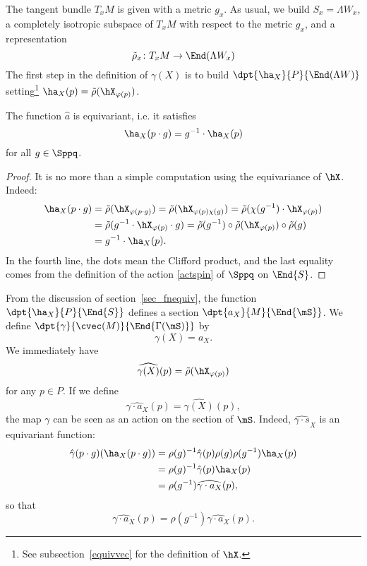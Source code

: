 The tangent bundle $T_xM$ is given with a metric $g_x$. As usual, we build $S_x=\Lambda W _x$, a completely isotropic subspace of $T_xM$ with respect to the metric $g_x$, and a representation
\[
	\tilde \rho_x\colon T_xM\to \End(\Lambda W_x)
\]
The first step in the definition of $\gamma(X)$ is to build $\dpt{\ha_X}{P}{\End(\Lambda W )}$ setting\footnote{See subsection~\ref{equivvec} for the definition of $\hX$.} $\ha_X(p)=\tilde\rho(\hX_{\varphi(p)})$.

\begin{lemma}
	The function $\hat a$ is equivariant, i.e. it satisfies
	\begin{equation}
		\ha_X(p\cdot g)=g^{-1}\cdot\ha_X(p)                             \label{equivaX}
	\end{equation}
	for all $g\in\Sppq$.
\end{lemma}

\begin{proof}
	It is no more than a simple computation using the equivariance of $\hX$. Indeed:
	\begin{equation}
		\begin{split}
			\ha_X(p\cdot g)&=\tilde\rho(\hX_{\varphi(p\cdot g)})=\tilde\rho(\hX_{\varphi(p)\chi(g)})=\tilde\rho(\chi(g^{-1})\cdot\hX_{\varphi(p)})\\
			&=\tilde\rho(g^{-1}\cdot\hX_{\varphi(p)}\cdot g)=\tilde\rho(g^{-1})\circ\tilde\rho(\hX_{\varphi(p)})\circ\tilde\rho(g)\\
			&=g^{-1}\cdot\ha_X(p).
		\end{split}
	\end{equation}
	In the fourth line, the dots mean the Clifford product, and the last equality comes from the definition of the action \eqref{actspin} of $\Sppq$ on $\End{S}$.
\end{proof}

From the discussion of section~\ref{sec_fnequiv}, the function $\dpt{\ha_X}{P}{\End{S}}$ defines a section $\dpt{a_X}{M}{\End{\mS}}$. We define $\dpt{\gamma}{\cvec(M)}{\End{\Gamma(\mS)}}$ by
\begin{equation}		\label{EqDefgammax}
	\gamma(X)=a_X.
\end{equation}
We immediately have
\[
	\widehat{\gamma(X)}(p)=\tilde\rho(\hX_{\varphi(p)})
\]
for any $p\in P$. If we define
\begin{equation}\label{3103r1}
	\widehat{\gamma\cdot a_X}(p)=\widehat{\gamma(X)}(p),
\end{equation}
the map $\gamma$ can be seen as an action on the section of $\mS$. Indeed, $\widehat{\gamma\cdot s}_X$ is an equivariant function:
\begin{equation}
	\begin{split}
		\hat{\gamma}(p\cdot g)(\ha_X(p\cdot g))
		&=\rho(g)^{-1}\hat{\gamma}(p)\rho(g)\rho(g^{-1})\ha_X(p)\\
		&=\rho(g)^{-1}\hat{\gamma}(p)\ha_X(p)\\
		&=\rho(g^{-1})\widehat{\gamma\cdot a_X}(p),
	\end{split}
\end{equation}
so that
\[
	\widehat{\gamma\cdot a_X}(p)=\rho(g^{-1})\widehat{\gamma\cdot a_X}(p).
\]

